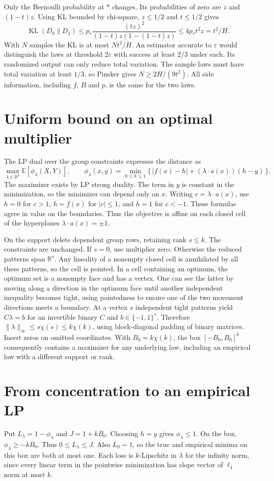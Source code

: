 \documentclass[11pt,a4paper]{amsart}
\newcommand{\E}{\mathbb E}
\newcommand{\KL}{\operatorname{KL}}
\begin{document}
Only the Bernoulli probability at $*$ changes. Its probabilities of zero are $z$ and $(1-t)z$. Using KL bounded by chi-square, $z\leq1/2$ and $t\leq1/2$ gives
\[
 \KL(D_0\|D_1)\leq p_*\frac{(tz)^2}{(1-t)z(1-(1-t)z)}
 \leq4p_*t^2z=t^2/H.
\]
With $N$ samples the KL is at most $Nt^2/H$. An estimator accurate to $\varepsilon$ would distinguish the laws at threshold $2\varepsilon$ with success at least $2/3$ under each. Its randomized output can only reduce total variation. The sample laws must have total variation at least $1/3$, so Pinsker gives $N\geq2H/(9t^2)$. All side information, including $f$, $B$ and $p$, is the same for the two laws.

\section{Uniform bound on an optimal multiplier}
The LP dual over the group constraints expresses the distance as
\[
       \max_{\lambda\in\mathbb R^k}\E[\phi_\lambda(X,Y)],\qquad
       \phi_\lambda(x,y)=\min_{0\leq h\leq1}
       \{\,|f(x)-h|+(\lambda\cdot a(x))(h-y)\,\}.
\]
The maximizer exists by LP strong duality. The term in $y$ is constant in the minimization, so the minimizer can depend only on $x$. Writing $c=\lambda\cdot a(x)$, use $h=0$ for $c>1$, $h=f(x)$ for $|c|\leq1$, and $h=1$ for $c<-1$. These formulas agree in value on the boundaries. Thus the objective is affine on each closed cell of the hyperplanes $\lambda\cdot a(x)=\pm1$.

On the support delete dependent group rows, retaining rank $s\leq k$. The constraints are unchanged. If $s=0$, use multiplier zero. Otherwise the reduced patterns span $\mathbb R^s$. Any lineality of a nonempty closed cell is annihilated by all these patterns, so the cell is pointed. In a cell containing an optimum, the optimum set is a nonempty face and has a vertex. One can see the latter by moving along a direction in the optimum face until another independent inequality becomes tight, using pointedness to ensure one of the two movement directions meets a boundary. At a vertex $s$ independent tight patterns yield $C\lambda=b$ for an invertible binary $C$ and $b\in\{-1,1\}^s$. Therefore $\|\lambda\|_\infty\leq s\chi(s)\leq k\chi(k)$, using block-diagonal padding of binary matrices. Insert zeros on omitted coordinates. With $B_0=k\chi(k)$, the box $[-B_0,B_0]^k$ consequently contains a maximizer for any underlying law, including an empirical law with a different support or rank.

\section{From concentration to an empirical LP}
Put $L_\lambda=1-\phi_\lambda$ and $J=1+k B_0$. Choosing $h=y$ gives $\phi_\lambda\leq1$. On the box, $\phi_\lambda\geq-kB_0$. Thus $0\leq L_\lambda\leq J$. Also $L_0=1$, so the true and empirical minima on this box are both at most one. Each loss is $k$-Lipschitz in $\lambda$ for the infinity norm, since every linear term in the pointwise minimization has slope vector of $\ell_1$ norm at most $k$.
\end{document}
